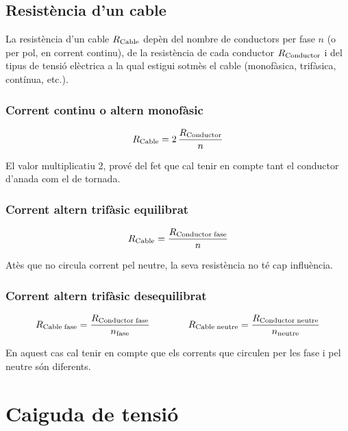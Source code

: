\subsection{Resistència d'un cable}

La resistència d'un cable $R_\mathrm{Cable}$ depèn del nombre de conductors per fase $n$ (o
per pol, en corrent continu), de la resistència de cada conductor $R_\mathrm{Conductor}$ i del
tipus de tensió elèctrica a la qual estigui sotmès el cable (monofàsica, trifàsica,
contínua, etc.).

\subsubsection*{Corrent continu o altern monofàsic}
\begin{equation}\label{eq:r_cc_mono}
    R_\mathrm{Cable} = 2\, \frac{R_\mathrm{Conductor}}{n}
\end{equation}

El valor multiplicatiu 2, prové del fet que cal tenir en compte tant el conductor d'anada
com el de tornada.

\subsubsection*{Corrent altern trifàsic equilibrat}
\vspace{-5mm}
\begin{equation}\label{eq:r_trifas}
R_\mathrm{Cable} = \frac{R_\mathrm{Conductor\;fase}}{n}
\end{equation}

Atès que no circula corrent pel neutre, la seva resistència no  té cap influència.

\subsubsection*{Corrent altern trifàsic desequilibrat}
\begin{equation}
    R_\mathrm{Cable\;fase} = \frac{R_\mathrm{Conductor\;fase}}{n_\mathrm{fase}} \qquad\qquad
    R_\mathrm{Cable\; neutre} = \frac{R_\mathrm{Conductor\;neutre}}{n_\mathrm{neutre}}
\end{equation}

En aquest cas cal tenir en compte que els corrents que circulen per les fase i pel neutre
són diferents.


\section{Caiguda de tensió}

